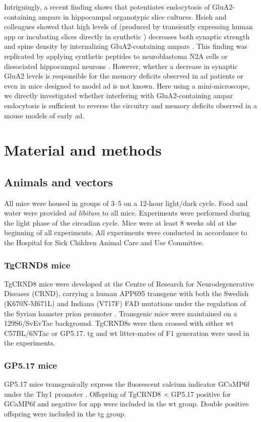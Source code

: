 Intriguingly, a recent finding shows that \abeta{} potentiates endocytosis of GluA2-containing \glspl{ampar} in hippocampal organotypic slice cultures.  Hsieh and colleagues showed that high levels of \abeta{} (produced by transiently expressing human \gls{app} or incubating slices directly in synthetic \abeta) decreases both synaptic strength and spine density by internalizing GluA2-containing \glspl{ampar} \citep{hsieh06}. This finding was replicated by applying synthetic \abeta{} peptides to neuroblastoma N2A cells \citep{zhao10} or dissociated hippocampal neurons \citep{liu10, zhao10}. However, whether a decrease in synaptic GluA2 levels is responsible for the memory deficits observed in \gls{ad} patients or even in mice designed to model \gls{ad} is not known. Here using a mini-microscope, we directly investigated whether interfering with GluA2-containing \gls{ampar} endocytosis is sufficient to reverse the circuitry and memory deficits observed in a mouse models of early \gls{ad}.
\section{Material and methods}

\subsection{Animals and vectors}
All mice were housed in groups of 3--5 on a 12-hour light/dark cycle. Food and water were provided \textit{ad libitum} to all mice. Experiments were performed during the light phase of the circadian cycle. Mice were at least 8 weeks old at the beginning of all experiments. All experiments were conducted in accordance to the Hospital for Sick Children Animal Care and Use Committee.

\subsubsection{TgCRND8 mice}
TgCRND8 mice were developed at the Centre of Research for Neurodegenerative Diseases (CRND), carrying a human APP695 transgene with both the Swedish (K670N-M671L) and Indiana (V717F) FAD mutations under the regulation of the Syrian hamster prion promoter \citep{chishti01}. Transgenic mice were maintained on a 129S6/SvEvTac background. TgCRND8s were then crossed with either \gls{wt} C57BL/6NTac or GP5.17. \Gls{tg} and \gls{wt} litter-mates of F1 generation were used in the experiments.


\subsubsection{GP5.17 mice}
GP5.17 mice transgenically express the fluorescent calcium indicator GCaMP6f under the Thy1 promoter \citep{dana14}. Offspring of TgCRND8 $\times$ GP5.17 positive for GCaMP6f and negative for \gls{app} were included in the \gls{wt} group. Double positive offspring were included in the \gls{tg} group.


